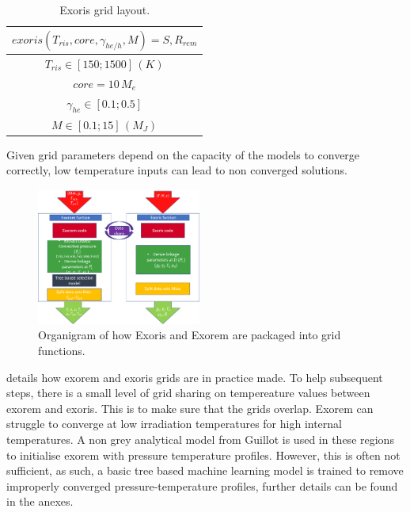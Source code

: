 \begin{table}[htb]%
\centering
\caption{Exoris grid layout.}
	\label{tab:Exoris}
	\begin{tabular}{c}
		\toprule
		{$exoris(T_{ris},core,\gamma_{he/h}, M) = S, R_{rem}$}  \\
		\midrule
        \midrule
        {$T_{ris} \in [150;1500] \, (K)$} \\
        \midrule
		{$core = 10 \, M_{e}$}   \\
        \midrule
		{$\gamma_{he} \in [0.1;0.5]$}   \\
        \midrule
		{$M \in [0.1;15] \, (M_J)$}   \\
        \bottomrule
	\end{tabular}
\end{table}


Given grid parameters depend on the capacity of the models to converge correctly, low temperature inputs can lead to non converged solutions. \par

\begin{figure}
    \centering
    \includegraphics[width=0.48\textwidth]{Images/grid_model_function.png}
    \caption{Organigram of how Exoris and Exorem are packaged into grid functions.}
    \label{fig:Exoris_Exorem_grid_functions}
\end{figure}

 details how exorem and exoris grids are in practice made. To help subsequent steps, there is a small level of grid sharing on tempereature values between exorem and exoris. This is to make sure that the grids overlap. Exorem can struggle to converge at low irradiation temperatures for high internal temperatures. A non grey analytical model from Guillot \parencite{guillot_radiative_2010} is used in these regions to initialise exorem with pressure temperature profiles. However, this is often not sufficient, as such, a basic tree based machine learning model is trained to remove improperly converged pressure-temperature profiles, further details can be found in the anexes. \par

